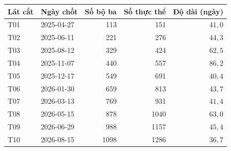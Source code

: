 \begin{tabular}{llrrr}
\toprule
Lát cắt & Ngày chốt & Số bộ ba & Số thực thể & Độ dài (ngày) \\
\midrule
T01 & 2025-04-27 & 113 & 151 & $41{,}0$ \\
T02 & 2025-06-11 & 221 & 276 & $44{,}3$ \\
T03 & 2025-08-12 & 329 & 424 & $62{,}5$ \\
T04 & 2025-11-07 & 440 & 557 & $86{,}2$ \\
T05 & 2025-12-17 & 549 & 691 & $40{,}4$ \\
T06 & 2026-01-30 & 659 & 813 & $43{,}7$ \\
T07 & 2026-03-13 & 769 & 931 & $41{,}4$ \\
T08 & 2026-05-15 & 878 & 1040 & $63{,}0$ \\
T09 & 2026-06-29 & 988 & 1157 & $45{,}4$ \\
T10 & 2026-08-15 & 1098 & 1286 & $36{,}7$ \\
\bottomrule
\end{tabular}
